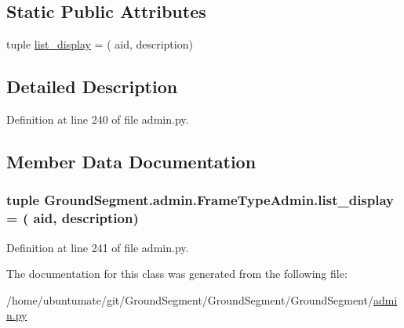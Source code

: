 \subsection*{Static Public Attributes}
\begin{DoxyCompactItemize}
\item 
tuple \hyperlink{class_ground_segment_1_1admin_1_1_frame_type_admin_a47955a9d7a773e6e0a58f93c76b56cfe}{list\+\_\+display} = ( \textquotesingle{}aid\textquotesingle{}, \textquotesingle{}description\textquotesingle{})
\end{DoxyCompactItemize}


\subsection{Detailed Description}


Definition at line 240 of file admin.\+py.



\subsection{Member Data Documentation}
\hypertarget{class_ground_segment_1_1admin_1_1_frame_type_admin_a47955a9d7a773e6e0a58f93c76b56cfe}{}
\subsubsection[{list\+\_\+display}]{\setlength{\rightskip}{0pt plus 5cm}tuple Ground\+Segment.\+admin.\+Frame\+Type\+Admin.\+list\+\_\+display = ( \textquotesingle{}aid\textquotesingle{}, \textquotesingle{}description\textquotesingle{})\hspace{0.3cm}{\ttfamily [static]}}\label{class_ground_segment_1_1admin_1_1_frame_type_admin_a47955a9d7a773e6e0a58f93c76b56cfe}


Definition at line 241 of file admin.\+py.



The documentation for this class was generated from the following file\+:\begin{DoxyCompactItemize}
\item 
/home/ubuntumate/git/\+Ground\+Segment/\+Ground\+Segment/\+Ground\+Segment/\hyperlink{admin_8py}{admin.\+py}\end{DoxyCompactItemize}
